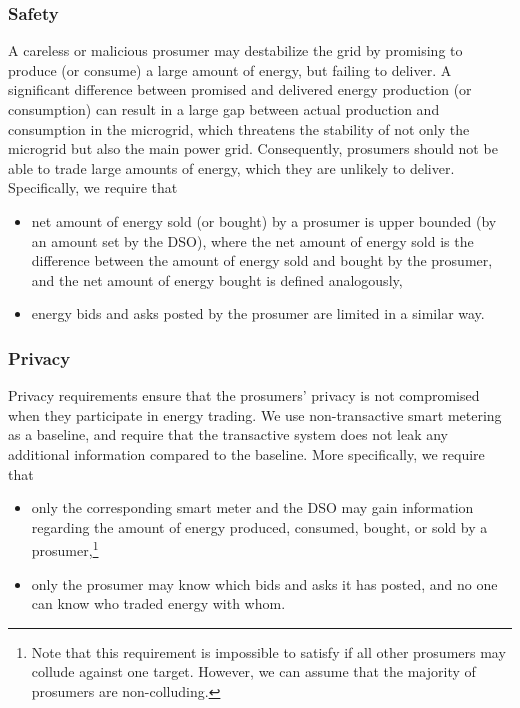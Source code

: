 \subsubsection{Safety}
A careless or malicious prosumer may destabilize the grid by promising to produce (or consume) a large amount of energy, but failing to deliver.
A significant difference between promised and delivered energy production (or consumption) can result in a large gap between actual production and consumption in the microgrid, which threatens the stability of not only the microgrid but also the main power grid.
Consequently, prosumers should not be able to trade large amounts of energy, which they are unlikely to deliver.
Specifically, we require that
\begin{itemize}[noitemsep,topsep=-\parskip]
\item net amount of energy sold (or bought) by a prosumer is upper bounded (by an amount set by the DSO), where the net amount of energy sold is the difference between the amount of energy sold and bought by the prosumer, and the net amount of energy bought is defined analogously,
\item energy bids and asks posted by the prosumer are limited in a similar way.
\end{itemize}

\subsubsection{Privacy} 
Privacy requirements ensure that the prosumers' privacy is not compromised when they participate in energy trading.
We use non-transactive smart metering as a baseline, and require that the transactive system does not leak any additional information compared to the baseline.
More specifically, we require that
\begin{itemize}[noitemsep,topsep=-\parskip]
\item only the corresponding smart meter and the DSO may gain information regarding the amount of energy produced, consumed, bought, or sold by a prosumer,\footnote{Note that this requirement is impossible to satisfy if all other prosumers may collude against one target. However, we can assume that the majority of prosumers are non-colluding.}
\item only the prosumer may know which bids and asks it has posted, and no one can know who traded energy with whom.
\end{itemize}


